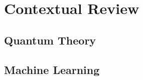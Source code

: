 
%         

\part{Contextual Review}\label{part:contextual_review}
    \chapter{Quantum Theory}\label{chapter:qm}
        
    \chapter{Machine Learning}\label{chapter:ml}
        

%         


